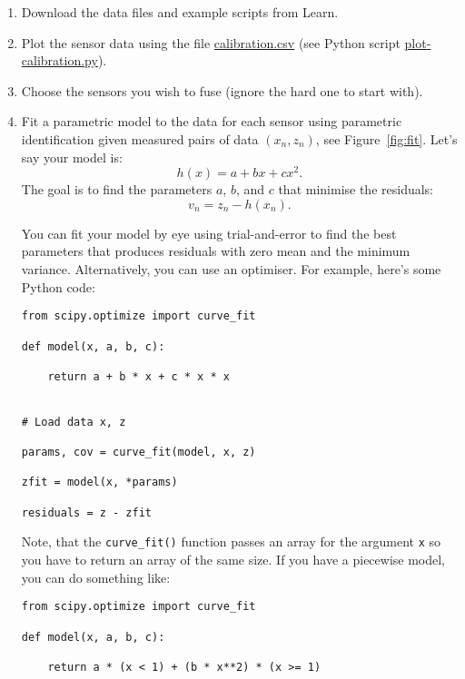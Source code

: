 \documentclass[a4paper, 12pt]{article}
\newcommand{\code}[1]{\texttt{#1}}
\newcommand{\reffig}[1]{\mbox{Figure~\ref{fig:#1}}}
\begin{document}
\begin{enumerate}
\item Download the data files and example scripts from Learn.

\item Plot the sensor data using the file \url{calibration.csv} (see
  Python script \url{plot-calibration.py}).

\item Choose the sensors you wish to fuse (ignore the hard one to
  start with).

\item Fit a parametric model to the data for each sensor using
  parametric identification given measured pairs of data $(x_n, z_n)$,
  see \reffig{fit}.  Let's say your model is:
  \begin{equation}
    h(x) = a + b x + c x^2.
  \end{equation}
  The goal is to find the parameters $a$, $b$, and $c$ that minimise
  the residuals:
    \begin{equation}
    v_n = z_n - h(x_n).
    \end{equation}

    You can fit your model by eye using trial-and-error to find the
    best parameters that produces residuals with zero mean and the
    minimum variance.  Alternatively, you can use an optimiser.  For
    example, here's some Python code:
%
\begin{verbatim}
from scipy.optimize import curve_fit

def model(x, a, b, c):

    return a + b * x + c * x * x


# Load data x, z

params, cov = curve_fit(model, x, z)

zfit = model(x, *params)

residuals = z - zfit
\end{verbatim}

  Note, that the \code{curve\_fit()} function passes an array for the
  argument \code{x} so you have to return an array of the same size.
  If you have a piecewise model, you can do something like:

\begin{verbatim}
from scipy.optimize import curve_fit

def model(x, a, b, c):

    return a * (x < 1) + (b * x**2) * (x >= 1)

\end{verbatim}


\end{enumerate}
\end{document}

